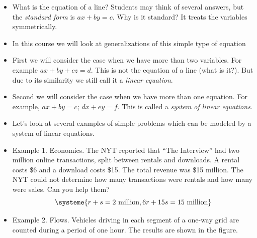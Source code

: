 \documentclass[11pt,oneside]{amsbook}
\theoremstyle{definition}
\theoremstyle{plain}
\theoremstyle{definition}
\theoremstyle{remark}
\numberwithin{equation}{section}
\numberwithin{figure}{section}
\begin{document}
\begin{itemize}
\item What is the equation of a line? Students may think of several answers, but the \emph{standard form} is $ax+by=c$. Why is it standard? It treats the variables symmetrically.
\item In this course we will look at generalizations of this simple type of equation
\item First we will consider the case when we have more than two variables. For example $ax+by+cz=d$. This is not the equation of a line (what is it?). But due to its similarity we still call it a \emph{linear equation}.
\item Second we will consider the case when we have more than one equation. For example, $ax+by=c$; $dx+ey=f$. This is called a \emph{system of linear equations}.
\item Let's look at several examples of simple problems which can be modeled by a system of linear equations.
\item Example 1. Economics. The NYT reported that ``The Interview'' had two million online transactions, split between rentals and downloads. A rental costs \$6 and a download costs \$15. The total revenue was \$15 million. The NYT could not determine how many transactions were rentals and how many were sales. Can you help them?
\[\systeme{r+s=2\text{ million},6r+15s=15\text{ million}}
\]
\item Example 2. Flows. Vehicles driving in each segment of a one-way grid are counted during a period of one hour. The results are shown in the figure.
  \begin{center}
\end{center}
\end{itemize}
\end{document}
